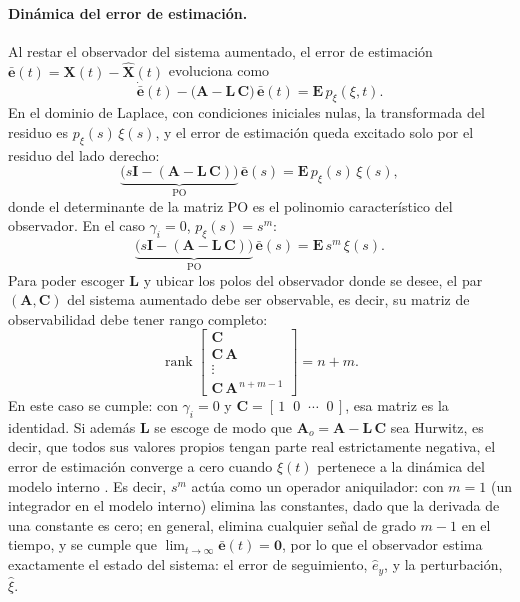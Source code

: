 \paragraph{Dinámica del error de estimación.} Al restar el observador del
sistema aumentado, el error de estimación
$\bar{\mathbf{e}}(t) = \mathbf{X}(t) - \widehat{\mathbf{X}}(t)$ evoluciona como
\begin{equation}
\dot{\bar{\mathbf{e}}}(t)
- \bigl(\mathbf{A} - \mathbf{L}\,\mathbf{C}\bigr)\,\bar{\mathbf{e}}(t)
= \mathbf{E}\,p_{\xi}(\xi,t) .
\end{equation}
En el dominio de Laplace, con condiciones iniciales nulas, la transformada del
residuo es $p_{\xi}(s)\,\xi(s)$, y el error de estimación queda excitado solo por
el residuo del lado derecho:
\begin{equation}
\underbrace{\bigl(s\mathbf{I} - (\mathbf{A} - \mathbf{L}\,\mathbf{C})\bigr)}_{\text{PO}}
\,\bar{\mathbf{e}}(s) = \mathbf{E}\,p_{\xi}(s)\,\xi(s),
\end{equation}
donde el determinante de la matriz PO es el polinomio característico del
observador. En el caso $\gamma_i = 0$, $p_{\xi}(s) = s^{m}$:
\begin{equation}
\underbrace{\bigl(s\mathbf{I} - (\mathbf{A} - \mathbf{L}\,\mathbf{C})\bigr)}_{\text{PO}}
\,\bar{\mathbf{e}}(s) = \mathbf{E}\,s^{m}\,\xi(s).
\end{equation}
Para poder escoger $\mathbf{L}$ y ubicar los polos del observador donde se
desee, el par $(\mathbf{A}, \mathbf{C})$ del sistema aumentado debe ser
observable, es decir, su matriz de observabilidad debe tener rango completo:
\begin{equation}
\operatorname{rank}
\begin{bmatrix}
\mathbf{C} \\ \mathbf{C}\,\mathbf{A} \\ \vdots \\
\mathbf{C}\,\mathbf{A}^{\,n+m-1}
\end{bmatrix} = n+m .
\label{eq:observabilidad}
\end{equation}
En este caso se cumple: con $\gamma_i = 0$ y
$\mathbf{C} = [\,1 \;\; 0 \;\; \cdots \;\; 0\,]$, esa matriz es la identidad.
Si además $\mathbf{L}$ se escoge de modo que $\mathbf{A}_o = \mathbf{A} - \mathbf{L}\,\mathbf{C}$
sea Hurwitz, es decir, que todos sus valores propios tengan parte real
estrictamente negativa, el error de estimación converge a cero cuando $\xi(t)$
pertenece a la dinámica del modelo interno . Es decir, $s^{m}$ actúa como un operador
aniquilador: con $m = 1$ (un integrador en el modelo interno) elimina las constantes,
dado que la derivada de una constante es cero; en general, elimina cualquier señal de
grado $m - 1$ en el tiempo, y se cumple que
$\lim_{t \to \infty} \bar{\mathbf{e}}(t) = \mathbf{0}$, por lo que el observador
estima exactamente el estado del sistema: el error de seguimiento, $\hat{e}_y$,
y la perturbación, $\hat{\xi}$.


